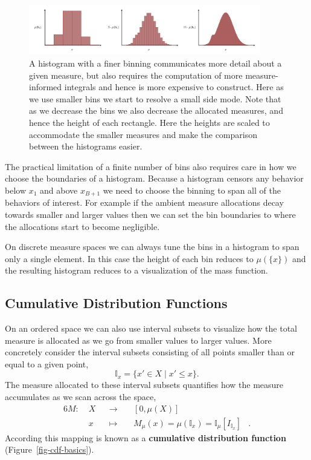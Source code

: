 \documentclass[
  letterpaper,
  DIV=11,
  numbers=noendperiod]{scrartcl}
\begin{document}
\begin{figure}

{\centering \includegraphics[width=0.9\textwidth,height=\textheight]{figures/histograms/varying_binning/varying_binning.pdf}

}

\caption{\label{fig-hist-binning}A histogram with a finer binning
communicates more detail about a given measure, but also requires the
computation of more measure-informed integrals and hence is more
expensive to construct. Here as we use smaller bins we start to resolve
a small side mode. Note that as we decrease the bins we also decrease
the allocated measures, and hence the height of each rectangle. Here the
heights are scaled to accommodate the smaller measures and make the
comparison between the histograms easier.}

\end{figure}

The practical limitation of a finite number of bins also requires care
in how we choose the boundaries of a histogram. Because a histogram
censors any behavior below \(x_{1}\) and above \(x_{B + 1}\) we need to
choose the binning to span all of the behaviors of interest. For example
if the ambient measure allocations decay towards smaller and larger
values then we can set the bin boundaries to where the allocations start
to become negligible.

On discrete measure spaces we can always tune the bins in a histogram to
span only a single element. In this case the height of each bin reduces
to \(\mu( \{ x \} )\) and the resulting histogram reduces to a
visualization of the mass function.

\hypertarget{cumulative-distribution-functions}{%
\subsection{Cumulative Distribution
Functions}\label{cumulative-distribution-functions}}

On an ordered space we can also use interval subsets to visualize how
the total measure is allocated as we go from smaller values to larger
values. More concretely consider the interval subsets consisting of all
points smaller than or equal to a given point, \[
\mathbb{I}_{x} = \{ x' \in X \mid x' \le x \}.
\] The measure allocated to these interval subsets quantifies how the
measure accumulates as we scan across the space, \begin{alignat*}{6}
M :\; & X & &\rightarrow& \; &[0, \mu(X)]&
\\
& x & &\mapsto& & M_{\mu}(x) = \mu(\mathbb{I}_{x}) = \mathbb{I}_{\mu}[I_{\mathbb{I}_{x}}] &.
\end{alignat*} According this mapping is known as a \textbf{cumulative
distribution function} (Figure~\ref{fig-cdf-basics}).
\end{document}
